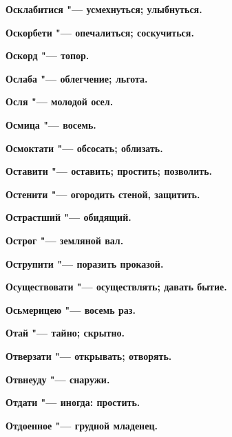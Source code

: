 \bfseries Осклабитися \normalfont{} "--- усмехнуться; улыбнуться. 




\bfseries Оскорбети \normalfont{} "--- опечалиться; соскучиться. 




\bfseries Оскорд \normalfont{} "--- топор. 




\bfseries Ослаба \normalfont{} "--- облегчение; льгота. 




\bfseries Осля \normalfont{} "--- молодой осел. 




\bfseries Осмица \normalfont{} "--- восемь. 




\bfseries Осмоктати \normalfont{} "--- обсосать; облизать. 




\bfseries Оставити \normalfont{} "--- оставить; простить; позволить. 




\bfseries Остенити \normalfont{} "--- огородить стеной, защитить. 




\bfseries Острастший \normalfont{} "--- обидящий. 




\bfseries Острог \normalfont{} "--- земляной вал. 




\bfseries Острупити \normalfont{} "--- поразить проказой. 




\bfseries Осуществовати \normalfont{} "--- осуществлять; давать бытие. 




\bfseries Осьмерицею \normalfont{} "--- восемь раз. 




\bfseries Отай \normalfont{} "--- тайно; скрытно. 




\bfseries Отверзати \normalfont{} "--- открывать; отворять. 




\bfseries Отвнеуду \normalfont{} "--- снаружи. 




\bfseries Отдати \normalfont{} "--- иногда: простить. 




\bfseries Отдоенное \normalfont{} "--- грудной младенец. 




